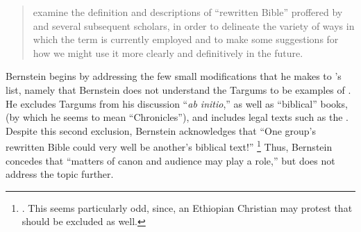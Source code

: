\begin{quote}
    examine the definition and descriptions of ``rewritten Bible'' proffered by \vermes and several subsequent scholars, in order to delineate the variety of ways in which the term is currently employed and to make some suggestions for how we might use it more clearly and definitively in the future.%
    \autocite[171--172]{bernstein_textus2005}
\end{quote}

Bernstein begins by addressing the few small modifications that he makes to \vermes's list, namely that Bernstein does not understand the Targums to be examples of \rwb. He excludes Targums from his discussion ``\emph{ab initio},'' as well as ``biblical'' books, (by which he seems to mean ``Chronicles''), and includes legal texts such as the \templescroll. Despite this second exclusion, Bernstein acknowledges that ``One group's rewritten Bible could very well be another's biblical text!''%
    \footnote{\cite[175]{bernstein_textus2005}. This seems particularly odd, since, an Ethiopian Christian may protest that \jub should be excluded as well.}
Thus, Bernstein concedes that ``matters of canon and audience may play a role,'' but does not address the topic further. 

